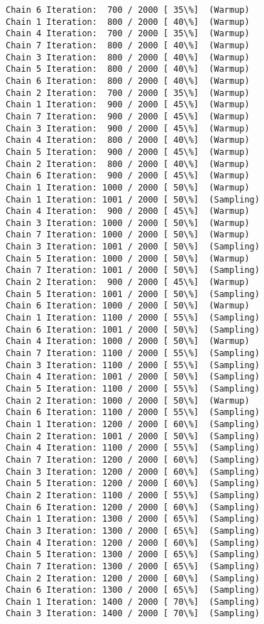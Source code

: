 \documentclass[11pt]{article}
\begin{document}
\begin{Verbatim}[commandchars=\\\{\}]
Chain 6 Iteration:  700 / 2000 [ 35\%]  (Warmup)
Chain 1 Iteration:  800 / 2000 [ 40\%]  (Warmup)
Chain 4 Iteration:  700 / 2000 [ 35\%]  (Warmup)
Chain 7 Iteration:  800 / 2000 [ 40\%]  (Warmup)
Chain 3 Iteration:  800 / 2000 [ 40\%]  (Warmup)
Chain 5 Iteration:  800 / 2000 [ 40\%]  (Warmup)
Chain 6 Iteration:  800 / 2000 [ 40\%]  (Warmup)
Chain 2 Iteration:  700 / 2000 [ 35\%]  (Warmup)
Chain 1 Iteration:  900 / 2000 [ 45\%]  (Warmup)
Chain 7 Iteration:  900 / 2000 [ 45\%]  (Warmup)
Chain 3 Iteration:  900 / 2000 [ 45\%]  (Warmup)
Chain 4 Iteration:  800 / 2000 [ 40\%]  (Warmup)
Chain 5 Iteration:  900 / 2000 [ 45\%]  (Warmup)
Chain 2 Iteration:  800 / 2000 [ 40\%]  (Warmup)
Chain 6 Iteration:  900 / 2000 [ 45\%]  (Warmup)
Chain 1 Iteration: 1000 / 2000 [ 50\%]  (Warmup)
Chain 1 Iteration: 1001 / 2000 [ 50\%]  (Sampling)
Chain 4 Iteration:  900 / 2000 [ 45\%]  (Warmup)
Chain 3 Iteration: 1000 / 2000 [ 50\%]  (Warmup)
Chain 7 Iteration: 1000 / 2000 [ 50\%]  (Warmup)
Chain 3 Iteration: 1001 / 2000 [ 50\%]  (Sampling)
Chain 5 Iteration: 1000 / 2000 [ 50\%]  (Warmup)
Chain 7 Iteration: 1001 / 2000 [ 50\%]  (Sampling)
Chain 2 Iteration:  900 / 2000 [ 45\%]  (Warmup)
Chain 5 Iteration: 1001 / 2000 [ 50\%]  (Sampling)
Chain 6 Iteration: 1000 / 2000 [ 50\%]  (Warmup)
Chain 1 Iteration: 1100 / 2000 [ 55\%]  (Sampling)
Chain 6 Iteration: 1001 / 2000 [ 50\%]  (Sampling)
Chain 4 Iteration: 1000 / 2000 [ 50\%]  (Warmup)
Chain 7 Iteration: 1100 / 2000 [ 55\%]  (Sampling)
Chain 3 Iteration: 1100 / 2000 [ 55\%]  (Sampling)
Chain 4 Iteration: 1001 / 2000 [ 50\%]  (Sampling)
Chain 5 Iteration: 1100 / 2000 [ 55\%]  (Sampling)
Chain 2 Iteration: 1000 / 2000 [ 50\%]  (Warmup)
Chain 6 Iteration: 1100 / 2000 [ 55\%]  (Sampling)
Chain 1 Iteration: 1200 / 2000 [ 60\%]  (Sampling)
Chain 2 Iteration: 1001 / 2000 [ 50\%]  (Sampling)
Chain 4 Iteration: 1100 / 2000 [ 55\%]  (Sampling)
Chain 7 Iteration: 1200 / 2000 [ 60\%]  (Sampling)
Chain 3 Iteration: 1200 / 2000 [ 60\%]  (Sampling)
Chain 5 Iteration: 1200 / 2000 [ 60\%]  (Sampling)
Chain 2 Iteration: 1100 / 2000 [ 55\%]  (Sampling)
Chain 6 Iteration: 1200 / 2000 [ 60\%]  (Sampling)
Chain 1 Iteration: 1300 / 2000 [ 65\%]  (Sampling)
Chain 3 Iteration: 1300 / 2000 [ 65\%]  (Sampling)
Chain 4 Iteration: 1200 / 2000 [ 60\%]  (Sampling)
Chain 5 Iteration: 1300 / 2000 [ 65\%]  (Sampling)
Chain 7 Iteration: 1300 / 2000 [ 65\%]  (Sampling)
Chain 2 Iteration: 1200 / 2000 [ 60\%]  (Sampling)
Chain 6 Iteration: 1300 / 2000 [ 65\%]  (Sampling)
Chain 1 Iteration: 1400 / 2000 [ 70\%]  (Sampling)
Chain 3 Iteration: 1400 / 2000 [ 70\%]  (Sampling)

\end{Verbatim}
\end{document}
